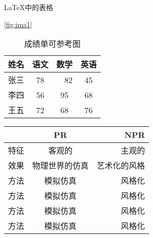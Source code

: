 \LaTeX{中的表格}
\begin{table}[h]
    \centering
    \caption{成绩单可参考图}\ref{fig:ima1}
    
    \begin{tabular}{|c|c|c|c|}
    \hline
    姓名 & 语文 & 数学 & 英语  \\
    \hline
    张三 & 78　&　82 & 45 \\
    \hline
    李四 & 56 & 95 & 68 \\
    \hline
    王五 & 72 & 68 & 76 \\
    \hline

    \end{tabular}
    \label{tab:table1}
\end{table}

\begin{tabular}{|l|c|r|}
    \hline & PR & NPR \\
    \hline 特征 & 客观的 & 主观的 \\
    \hline 效果 & 物理世界的仿真 & 艺术化的风格 \\
    \hline 方法 & 模拟仿真 & 风格化 \\
    \hline 方法 & 模拟仿真 & 风格化 \\
    \hline 方法 & 模拟仿真 & 风格化 \\
    \hline 方法 & 模拟仿真 & 风格化 \\
\end{tabular}

